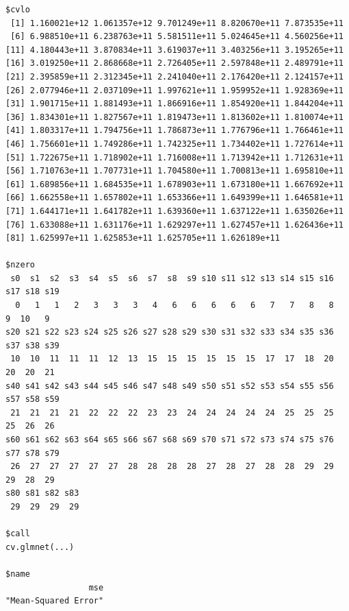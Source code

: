 \documentclass[
]{article}
\begin{document}
\begin{verbatim}
$cvlo
 [1] 1.160021e+12 1.061357e+12 9.701249e+11 8.820670e+11 7.873535e+11
 [6] 6.988510e+11 6.238763e+11 5.581511e+11 5.024645e+11 4.560256e+11
[11] 4.180443e+11 3.870834e+11 3.619037e+11 3.403256e+11 3.195265e+11
[16] 3.019250e+11 2.868668e+11 2.726405e+11 2.597848e+11 2.489791e+11
[21] 2.395859e+11 2.312345e+11 2.241040e+11 2.176420e+11 2.124157e+11
[26] 2.077946e+11 2.037109e+11 1.997621e+11 1.959952e+11 1.928369e+11
[31] 1.901715e+11 1.881493e+11 1.866916e+11 1.854920e+11 1.844204e+11
[36] 1.834301e+11 1.827567e+11 1.819473e+11 1.813602e+11 1.810074e+11
[41] 1.803317e+11 1.794756e+11 1.786873e+11 1.776796e+11 1.766461e+11
[46] 1.756601e+11 1.749286e+11 1.742325e+11 1.734402e+11 1.727614e+11
[51] 1.722675e+11 1.718902e+11 1.716008e+11 1.713942e+11 1.712631e+11
[56] 1.710763e+11 1.707731e+11 1.704580e+11 1.700813e+11 1.695810e+11
[61] 1.689856e+11 1.684535e+11 1.678903e+11 1.673180e+11 1.667692e+11
[66] 1.662558e+11 1.657802e+11 1.653366e+11 1.649399e+11 1.646581e+11
[71] 1.644171e+11 1.641782e+11 1.639360e+11 1.637122e+11 1.635026e+11
[76] 1.633088e+11 1.631176e+11 1.629297e+11 1.627457e+11 1.626436e+11
[81] 1.625997e+11 1.625853e+11 1.625705e+11 1.626189e+11

$nzero
 s0  s1  s2  s3  s4  s5  s6  s7  s8  s9 s10 s11 s12 s13 s14 s15 s16 s17 s18 s19 
  0   1   1   2   3   3   3   4   6   6   6   6   6   7   7   8   8   9  10   9 
s20 s21 s22 s23 s24 s25 s26 s27 s28 s29 s30 s31 s32 s33 s34 s35 s36 s37 s38 s39 
 10  10  11  11  11  12  13  15  15  15  15  15  15  17  17  18  20  20  20  21 
s40 s41 s42 s43 s44 s45 s46 s47 s48 s49 s50 s51 s52 s53 s54 s55 s56 s57 s58 s59 
 21  21  21  21  22  22  22  23  23  24  24  24  24  24  25  25  25  25  26  26 
s60 s61 s62 s63 s64 s65 s66 s67 s68 s69 s70 s71 s72 s73 s74 s75 s76 s77 s78 s79 
 26  27  27  27  27  27  28  28  28  28  27  28  27  28  28  29  29  29  28  29 
s80 s81 s82 s83 
 29  29  29  29 

$call
cv.glmnet(...)

$name
                 mse 
"Mean-Squared Error" 


\end{verbatim}
\end{document}
